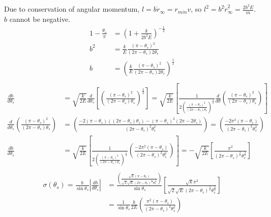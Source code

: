 \documentclass[]{article}
\begin{document}
	Due to conservation of angular momentum, $ l = b\dot{r}_\infty = r_{min}v $, so $ l^2 = b^2 \dot{r}_\infty^2 = \frac{2b^2E}{m} $. $b$ cannot be negative.
	\begin{equation}
		\begin{split}
			1 - \frac{\theta_s}{\pi} &= \left(1 + \frac{k}{2b^2E} \right)^{-\frac{1}{2}} \\
			b^2 &= \frac{k}{E} \frac{(\pi - \theta_s)^2}{(2\pi - \theta_s)2\theta_s} \\
			b &= \left( \frac{k}{E} \frac{(\pi - \theta_s)^2}{(2\pi - \theta_s)2\theta_s} \right)^{\frac{1}{2}} \\
		\end{split}
	\end{equation}
	\begin{equation}
		\begin{split}
			\frac{db}{d\theta_s} &=  \sqrt{\frac{k}{2E}} \frac{d}{d\theta_s}\left[ \left( \frac{(\pi - \theta_s)^2}{(2\pi - \theta_s)\theta_s} \right)^{\frac{1}{2}} \right]
			= \sqrt{\frac{k}{2E}} \left[ \frac{1}{2\left( \frac{(\pi - \theta_s)^2}{(2\pi - \theta_s)\theta_s} \right)^\frac{1}{2}} \frac{d}{d\theta} \left( \frac{(\pi - \theta_s)^2}{(2\pi - \theta_s)\theta_s} \right) \right] \\
			\frac{d}{d\theta_s} \left( \frac{(\pi - \theta_s)^2}{(2\pi - \theta_s)\theta_s} \right)
			&= \left( \frac{-2(\pi - \theta_s)((2\pi - \theta_s)\theta_s) - (\pi - \theta_s)^2(2\pi - 2\theta_s)}{(2\pi - \theta_s)^2\theta^2_s} \right)
			= \left( \frac{-2\pi^2(\pi - \theta_s)}{(2\pi - \theta_s)^2\theta^2_s} \right) \\
			\frac{db}{d\theta_s} &= \sqrt{\frac{k}{2E}} \left[ \frac{1}{2\left( \frac{(\pi - \theta_s)^2}{(2\pi - \theta_s)\theta_s} \right)^\frac{1}{2}} \left( \frac{-2\pi^2(\pi - \theta_s)}{(2\pi - \theta_s)^2\theta^2_s} \right) \right]
			= -\sqrt{\frac{k}{2E}} \left[\frac{\pi^2}{(2\pi-\theta_s)^\frac{3}{2} \theta^\frac{3}{2}_s} \right] \\
		\end{split}
	\end{equation}
	\begin{equation}
		\begin{split}
			\sigma(\theta_s) = \frac{b}{\sin \theta_s} \left| \frac{db}{d\theta_s} \right|
			&= \frac{\left( \frac{\sqrt{k}(\pi - \theta_s)}{\sqrt{2}\sqrt{E}(2\pi - \theta_s)^\frac{1}{2}\theta^\frac{1}{2}_s} \right)}{\sin \theta_s} \left[\frac{\sqrt{k}\pi^2}{\sqrt{2}\sqrt{E}(2\pi-\theta_s)^\frac{3}{2} \theta^\frac{3}{2}_s} \right] \\
			&= \frac{1}{\sin \theta_s} \frac{k}{2E} \left( \frac{\pi^2(\pi - \theta_s)}{(2\pi - \theta_s)^2\theta^2_s} \right) \\
		\end{split}
	\end{equation}
\end{document}
